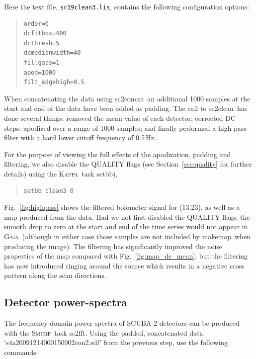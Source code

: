 \documentclass[twoside,11pt]{article}
\newcommand{\xref}[3]{#1}
\newcommand{\xlabel}[1]{}
\renewcommand{\_}{\texttt{\symbol{95}}}
\newenvironment{myquote}{\begin{quote}\begin{small}}{\end{small}\end{quote}}
\newcommand{\Kappa}{\xref{\textsc{Kappa}}{sun95}{}}
\newcommand{\gaia}{\xref{\textsc{Gaia}}{sun214}{}}
\newcommand{\smurf}{\xref{\textsc{Smurf}}{sun258}{}}
\newcommand{\task}[1]{\textsf{#1}}
\newcommand{\concat}{\xref{\task{sc2concat}}{sun258}{SC2CONCAT}}
\newcommand{\fft}{\xref{\task{sc2fft}}{sun258}{SC2FFT}}
\newcommand{\clean}{\xref{\task{sc2clean}}{sun258}{SC2CLEAN}}
\newcommand{\makemap}{\xref{\task{makemap}}{sun258}{MAKEMAP}}
\newcommand{\setbb}{\xref{\task{setbb}}{sun95}{SETBB}}
\begin{document}
Here the text file, \texttt{sc19\_clean3.lis}, contains the following
configuration options:

\begin{myquote}
\begin{verbatim}
order=0
dcfitbox=400
dcthresh=5
dcmedianwidth=40
fillgaps=1
apod=1000
filt_edgehigh=0.5
\end{verbatim}
\end{myquote}

When concatenating the data using \concat\ an additional 1000 samples
at the start and end of the data have been added as padding. The call
to \clean\ has done several things: removed the mean value of each
detector; corrected DC steps; apodized over a range of 1000 samples;
and finally performed a high-pass filter with a hard lower cutoff
frequency of 0.5\,Hz.

For the purpose of viewing the full effects of the apodization,
padding and filtering, we also disable the QUALITY flags (see
Section~\ref{sec:quality} for further details) using the \Kappa\ task
\setbb),

\begin{myquote}
\begin{verbatim}
setbb clean3 0
\end{verbatim}
\end{myquote}

Fig.~\ref{fig:highpass} shows the filtered bolometer signal for
(13,23), as well as a map produced from the data. Had we not first
disabled the QUALITY flags, the smooth drop to zero at the start and
end of the time series would not appear in \gaia\ (although in either
case those samples are not included by \makemap\ when producing the
image).  The filtering has significantly improved the noise properties
of the map compared with Fig.~\ref{fig:map_dc_mean}, but the filtering
has now introduced ringing around the source which results in a
negative cross pattern along the scan directions.

\subsection{\xlabel{pspec}Detector power-spectra}

The frequency-domain power spectra of SCUBA-2 detectors can be
produced with the \smurf\ task \fft. Using the padded, concatenated
data `s4a20091214\_00015\_0002\_con2.sdf' from the previous step, use the
following commands:
\end{document}
